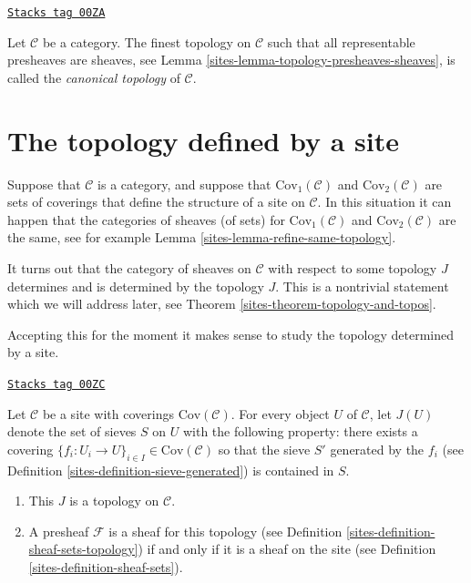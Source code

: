 \begin{definition}
\label{sites-definition-canonical-topology}
\href{https://stacks.math.columbia.edu/tag/00ZA}{\texttt{Stacks tag 00ZA}}

Let $\mathcal{C}$ be a category.
The finest topology on $\mathcal{C}$ such that
all representable presheaves are sheaves, see
Lemma \ref{sites-lemma-topology-presheaves-sheaves},
is called the {\it canonical topology} of $\mathcal{C}$.
\end{definition}

\section{The topology defined by a site}
\label{sites-section-topology-site}
Suppose that $\mathcal{C}$ is a category, and suppose that
$\text{Cov}_1(\mathcal{C})$ and $\text{Cov}_2(\mathcal{C})$
are sets of coverings that define the structure of a site
on $\mathcal{C}$. In this situation it can happen that
the categories of sheaves (of sets) for $\text{Cov}_1(\mathcal{C})$
and $\text{Cov}_2(\mathcal{C})$ are the same, see for example
Lemma \ref{sites-lemma-refine-same-topology}.

\medskip\noindent
It turns out that the category of sheaves on $\mathcal{C}$
with respect to some topology $J$
determines and is determined by the topology $J$.
This is a nontrivial statement which we will address later,
see Theorem \ref{sites-theorem-topology-and-topos}.

\medskip\noindent
Accepting this for the moment it makes sense to study the
topology determined by a site.

\begin{lemma}
\label{sites-lemma-site-gives-topology}
\href{https://stacks.math.columbia.edu/tag/00ZC}{\texttt{Stacks tag 00ZC}}

Let $\mathcal{C}$ be a site with coverings $\text{Cov}(\mathcal{C})$.
For every object $U$ of $\mathcal{C}$, let $J(U)$ denote
the set of sieves $S$ on $U$ with the following property:
there exists a covering
$\{f_i : U_i \to U\}_{i\in I} \in \text{Cov}(\mathcal{C})$
so that the sieve $S'$ generated by the $f_i$ (see Definition
\ref{sites-definition-sieve-generated}) is contained in $S$.
\begin{enumerate}
\item This $J$ is a topology on $\mathcal{C}$.
\item A presheaf $\mathcal{F}$ is a sheaf for this topology
(see Definition \ref{sites-definition-sheaf-sets-topology})
if and only if it is a sheaf on the site (see
Definition \ref{sites-definition-sheaf-sets}).
\end{enumerate}
\end{lemma}

